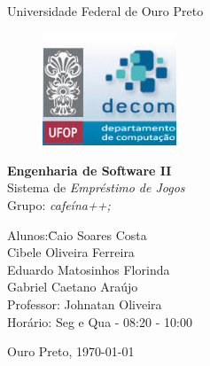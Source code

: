 \documentclass[a4paper, 12pt]{article}
\begin{document}

\begin{titlepage}
	\begin{center}
		\huge{Universidade Federal de Ouro Preto}

\vspace{10pt}
\begin{figure}[!ht]
\centering
\includegraphics[width=4cm]{img/logo.jpg}
\end{figure}
        
        \vspace{85pt}
        
		\textbf{\LARGE{Engenharia de Software II}}\\
		\large{Sistema de \textit{Empréstimo de Jogos}\\ Grupo: \textit{cafeína++;}}
		\vspace{160pt}
		
	\end{center}
	
	\begin{flushleft}
		\begin{tabbing}
			Alunos:\qquad\qquad\= Caio Soares Costa \\
			\>Cibele Oliveira Ferreira \\
            \>Eduardo Matosinhos Florinda \\
            \>Gabriel Caetano Araújo \\
			Professor:\> Johnatan Oliveira \\
			Horário:\> Seg e Qua - 08:20 - 10:00\\
		
	\end{tabbing}
		  
	\end{flushleft}
	
	\begin{center}
		Ouro Preto, \today
	\end{center}
\end{titlepage}
\newpage
\tableofcontents
\thispagestyle{empty}
\end{document}
